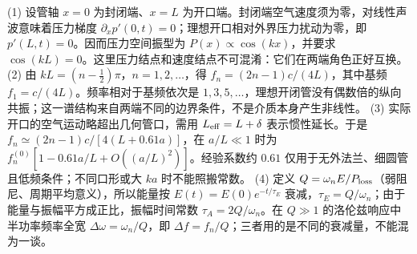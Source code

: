 (1) 设管轴 \(x=0\) 为封闭端、\(x=L\) 为开口端。封闭端空气速度须为零，对线性声波意味着压力梯度 \(\partial_xp'(0,t)=0\)；理想开口相对外界压力扰动为零，即 \(p'(L,t)=0\)。因而压力空间振型为 \(P(x)\propto\cos(kx)\)，并要求 \(\cos(kL)=0\)。这里压力结点和速度结点不可混淆：它们在两端角色正好互换。
(2) 由 \(kL=(n-\tfrac12)\pi\)，\(n=1,2,\ldots\)，得 \(f_n=(2n-1)c/(4L)\)，其中基频 \(f_1=c/(4L)\)。频率相对于基频依次是 \(1,3,5,\ldots\)，理想开闭管没有偶数倍的纵向共振；这一谱结构来自两端不同的边界条件，不是介质本身产生非线性。
(3) 实际开口的空气运动略超出几何管口，需用 \(L_{\rm eff}=L+\delta\) 表示惯性延长。于是 \(f_n\simeq(2n-1)c/[4(L+0.61a)]\)，在 \(a/L\ll1\) 时为 \(f_n^{(0)}[1-0.61a/L+O((a/L)^2)]\)。经验系数约 \(0.61\) 仅用于无外法兰、细圆管且低频条件；不同口形或大 \(ka\) 时不能照搬常数。
(4) 定义 \(Q=\omega_n E/P_{\rm loss}\)（弱阻尼、周期平均意义），所以能量按 \(E(t)=E(0)e^{-t/\tau_E}\) 衰减，\(\tau_E=Q/\omega_n\)；由于能量与振幅平方成正比，振幅时间常数 \(\tau_A=2Q/\omega_n\)。在 \(Q\gg1\) 的洛伦兹响应中半功率频率全宽 \(\Delta\omega=\omega_n/Q\)，即 \(\Delta f=f_n/Q\)；三者用的是不同的衰减量，不能混为一谈。
